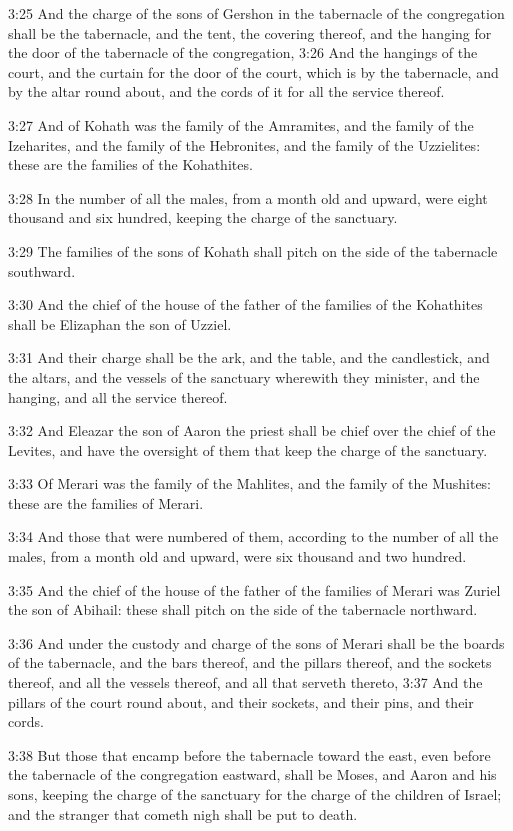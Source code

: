 3:25 And the charge of the sons of Gershon in the tabernacle of the
congregation shall be the tabernacle, and the tent, the covering
thereof, and the hanging for the door of the tabernacle of the
congregation, 3:26 And the hangings of the court, and the curtain for
the door of the court, which is by the tabernacle, and by the altar
round about, and the cords of it for all the service thereof.

3:27 And of Kohath was the family of the Amramites, and the family of
the Izeharites, and the family of the Hebronites, and the family of
the Uzzielites: these are the families of the Kohathites.

3:28 In the number of all the males, from a month old and upward, were
eight thousand and six hundred, keeping the charge of the sanctuary.

3:29 The families of the sons of Kohath shall pitch on the side of the
tabernacle southward.

3:30 And the chief of the house of the father of the families of the
Kohathites shall be Elizaphan the son of Uzziel.

3:31 And their charge shall be the ark, and the table, and the
candlestick, and the altars, and the vessels of the sanctuary
wherewith they minister, and the hanging, and all the service thereof.

3:32 And Eleazar the son of Aaron the priest shall be chief over the
chief of the Levites, and have the oversight of them that keep the
charge of the sanctuary.

3:33 Of Merari was the family of the Mahlites, and the family of the
Mushites: these are the families of Merari.

3:34 And those that were numbered of them, according to the number of
all the males, from a month old and upward, were six thousand and two
hundred.

3:35 And the chief of the house of the father of the families of
Merari was Zuriel the son of Abihail: these shall pitch on the side of
the tabernacle northward.

3:36 And under the custody and charge of the sons of Merari shall be
the boards of the tabernacle, and the bars thereof, and the pillars
thereof, and the sockets thereof, and all the vessels thereof, and all
that serveth thereto, 3:37 And the pillars of the court round about,
and their sockets, and their pins, and their cords.

3:38 But those that encamp before the tabernacle toward the east, even
before the tabernacle of the congregation eastward, shall be Moses,
and Aaron and his sons, keeping the charge of the sanctuary for the
charge of the children of Israel; and the stranger that cometh nigh
shall be put to death.

